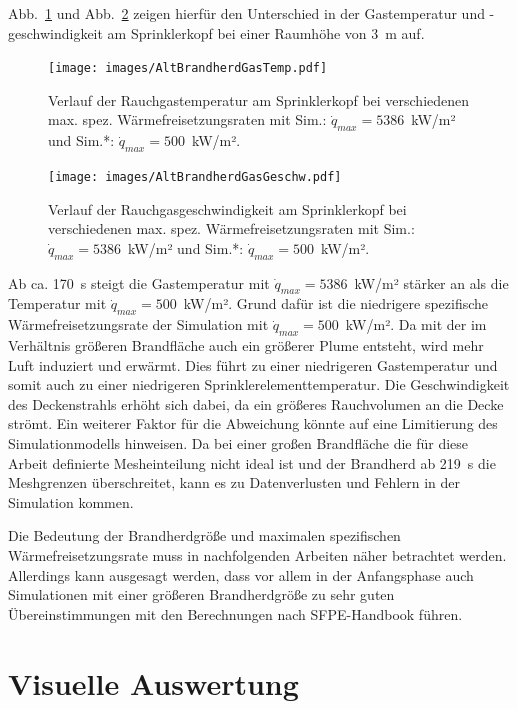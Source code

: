 Abb.~\ref{fig:GastempAltBrandherd} und Abb.~\ref{fig:GasgeschwAltBrandherd} zeigen hierfür den Unterschied in der Gastemperatur und -geschwindigkeit am Sprinklerkopf bei einer Raumhöhe von 3~m auf.
\begin{figure}
    \centering
    \texttt{[image: images/AltBrandherdGasTemp.pdf]}
    \caption{Verlauf der Rauchgastemperatur am Sprinklerkopf bei verschiedenen max. spez. Wärmefreisetzungsraten mit Sim.: $\Dot{q}_{max}=5386$~kW/m² und Sim.*: $\Dot{q}_{max}=500$~kW/m².}
    \label{fig:GastempAltBrandherd}
\end{figure}
\begin{figure}
    \centering
    \texttt{[image: images/AltBrandherdGasGeschw.pdf]}
    \caption{Verlauf der Rauchgasgeschwindigkeit am Sprinklerkopf bei verschiedenen max. spez. Wärmefreisetzungsraten mit Sim.: $\Dot{q}_{max}=5386$~kW/m² und Sim.*: $\Dot{q}_{max}=500$~kW/m².}
    \label{fig:GasgeschwAltBrandherd}
\end{figure}
Ab ca. 170~s steigt die Gastemperatur mit $\Dot{q}_{max}=5386$~kW/m² stärker an als die Temperatur mit $\Dot{q}_{max}=500$~kW/m². Grund dafür ist die niedrigere spezifische Wärmefreisetzungsrate der Simulation mit $\Dot{q}_{max}=500$~kW/m². Da mit der im Verhältnis größeren Brandfläche auch ein größerer Plume entsteht, wird mehr Luft induziert und erwärmt. Dies führt zu einer niedrigeren Gastemperatur und somit auch zu einer niedrigeren Sprinklerelementtemperatur. Die Geschwindigkeit des Deckenstrahls erhöht sich dabei, da ein größeres Rauchvolumen an die Decke strömt. 
Ein weiterer Faktor für die Abweichung könnte auf eine Limitierung des Simulationmodells hinweisen. Da bei einer großen Brandfläche die für diese Arbeit definierte Mesheinteilung nicht ideal ist und der Brandherd ab 219~s die Meshgrenzen überschreitet, kann es zu Datenverlusten und Fehlern in der Simulation kommen.

Die Bedeutung der Brandherdgröße und maximalen spezifischen Wärmefreisetzungsrate muss in nachfolgenden Arbeiten näher betrachtet werden. Allerdings kann ausgesagt werden, dass vor allem in der Anfangsphase auch Simulationen mit einer größeren Brandherdgröße zu sehr guten Übereinstimmungen mit den Berechnungen nach SFPE-Handbook führen. 







\FloatBarrier
\section{Visuelle Auswertung}
\label{VisuelleAuswertung}

